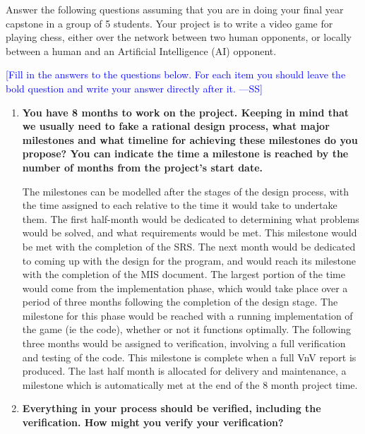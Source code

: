 \documentclass[12pt,fleqn]{examtst}
\newcommand{\authornote}[3]{\textcolor{#1}{[#3 ---#2]}}
\newcommand{\authornote}[3]{}
\newcommand{\wss}[1]{\authornote{blue}{SS}{#1}}
\begin{document}

\newpage

 Answer the following questions assuming that you are in doing
your final year capstone in a group of 5 students.  Your project is to write a
video game for playing chess, either over the network between two human
opponents, or locally between a human and an Artificial Intelligence (AI)
opponent.

\bigskip

\noindent \wss{Fill in the answers to the questions below.  For each item you
  should leave the bold question and write your answer directly after it.}

\begin{enumerate}
  
\item \textbf{You have 8 months to work on the project.  Keeping in mind that we
  usually need to fake a rational design process, what major milestones and what
  timeline for achieving these milestones do you propose?  You can indicate the
  time a milestone is reached by the number of months from the project's start date.}

The milestones can be modelled after the stages of the design process, with the time assigned to each relative to the time it would take to undertake them. The first half-month would be dedicated to determining what problems would be solved, and what requirements would be met. This milestone would be met with the completion of the SRS. The next month would be dedicated to coming up with the design for the program, and would reach its milestone with the completion of the MIS document. The largest portion of the time would come from the implementation phase, which would take place over a period of three months following the completion of the design stage. The milestone for this phase would be reached with a running implementation of the game (ie the code), whether or not it functions optimally. The following three months would be assigned to verification, involving a full verification and testing of the code. This milestone is complete when a full VnV report is produced. The last half month is allocated for delivery and maintenance, a milestone which is automatically met at the end of the 8 month project time.
  
\item \textbf{Everything in your process should be verified, including the
    verification.  How might you verify your verification?}


\end{enumerate}
\end{document}
